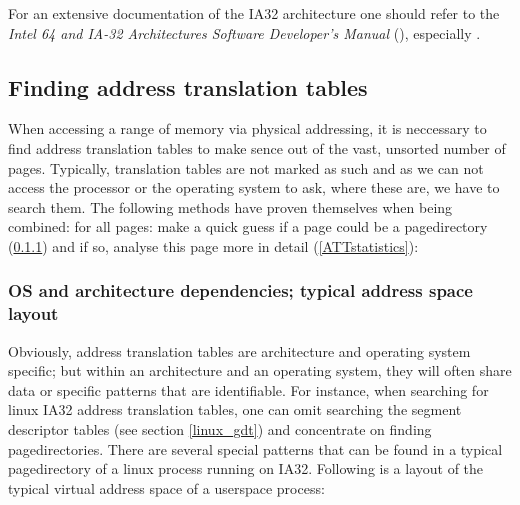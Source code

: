 For an extensive documentation of the IA32 architecture one should refer to the
\emph{Intel 64 and IA-32 Architectures Software Developer's Manual}
(\cite{IA32_SDM_1:2006,IA32_SDM_2a:2006,IA32_SDM_2b:2006,IA32_SDM_3a:2006,IA32_SDM_3b:2006}),
especially \cite{IA32_SDM_3a:2006}.



\subsection{Finding address translation tables}
\label{findingATT}

When accessing a range of memory via physical addressing, it is neccessary to
find address translation tables to make sence out of the vast, unsorted number
of pages. Typically, translation tables are not marked as such and as we can not
access the processor or the operating system to ask, where these are, we have to
search them. The following methods have proven themselves when being combined:
for all pages: make a quick guess if a page could be a pagedirectory
(\ref{ATTguess}) and if so, analyse this page more in detail
(\ref{ATTstatistics}):



\subsubsection{OS and architecture dependencies; typical address space layout}

\label{ATTguess} Obviously, address translation tables are architecture and
operating system specific; but within an architecture and an operating system,
they will often share data or specific patterns that are identifiable. For
instance, when searching for linux IA32 address translation tables, one can omit
searching the segment descriptor tables (see section \ref{linux_gdt}) and
concentrate on finding pagedirectories. There are several special patterns that
can be found in a typical pagedirectory of a linux process running on IA32.
Following is a layout of the typical virtual address space of a userspace
process:

